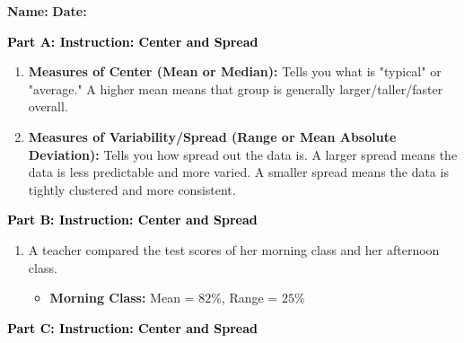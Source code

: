 \documentclass[12pt, letterpaper, fleqn]{article}
\begin{document}
\textbf{Name:} \underline{\hspace{5cm}}
\hfill
\textbf{Date:} \underline{\hspace{3cm}}\\

\begin{tcolorbox}[colback=customteal!20]
\large\textcolor{black}{\textbf{Part A: Instruction: Center and Spread}}
\end{tcolorbox}

\vspace{3mm}

\begin{enumerate}[itemsep=2.2cm, leftmargin=0.6cm]
\item \textbf{Measures of Center (Mean or Median):} Tells you what is "typical" or "average." A higher mean means that group is generally larger/taller/faster overall.
\item \textbf{Measures of Variability/Spread (Range or Mean Absolute Deviation):} Tells you how spread out the data is. A larger spread means the data is less predictable and more varied. A smaller spread means the data is tightly clustered and more consistent.
\end{enumerate}

\newpage

\begin{tcolorbox}[colback=customteal!20]
\large\textcolor{black}{\textbf{Part B: Instruction: Center and Spread}}
\end{tcolorbox}

\vspace{3mm}

\begin{enumerate}[itemsep=2.2cm, leftmargin=0.6cm, resume]
\item A teacher compared the test scores of her morning class and her afternoon class.
\begin{itemize}
\item \textbf{Morning Class:} Mean = $82\%$, Range = $25\%$
\end{itemize}
\end{enumerate}

\newpage

\begin{tcolorbox}[colback=customteal!20]
\large\textcolor{black}{\textbf{Part C: Instruction: Center and Spread}}
\end{tcolorbox}
\end{document}
